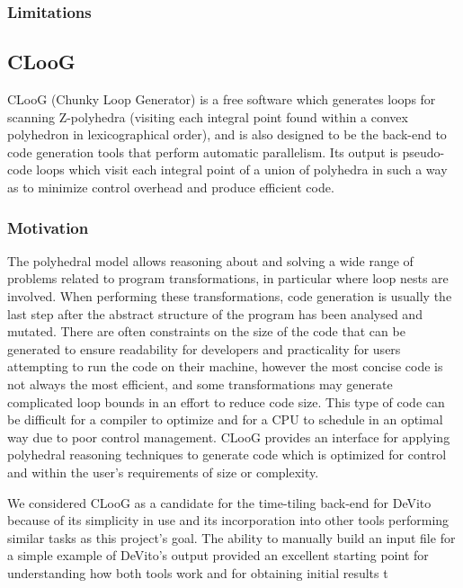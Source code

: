 \documentclass[a4paper,12pt,twoside]{report}
\begin{document}
\subsubsection{Limitations}

\subsection{CLooG}
CLooG (Chunky Loop Generator) is a free software which generates loops for scanning Z-polyhedra (visiting each integral
point found within a convex polyhedron in lexicographical order), and is also designed to be
the back-end to code generation tools that perform automatic parallelism. Its output is pseudo-code loops which visit
each integral point of a union of polyhedra in such a way as to minimize control overhead and produce efficient code.
\subsubsection{Motivation}
The polyhedral model allows reasoning about and solving a wide range of problems related to program transformations,
in particular where loop nests are involved. When performing these transformations, code generation is usually the last
step after the abstract structure of the program has been analysed and mutated. There are often constraints on the size of the code
that can be generated to ensure readability for developers and practicality for users attempting to run the code on their machine,
however the most concise code is not always the most efficient, and some transformations may generate complicated loop bounds in an effort
to reduce code size. This type of code can be difficult for a compiler to optimize and for a CPU to schedule in an optimal way due to
poor control management. CLooG provides an interface for applying polyhedral reasoning techniques to generate code which is optimized for control
and within the user's requirements of size or complexity.

We considered CLooG as a candidate for the time-tiling back-end for DeVito because of its simplicity in use and its incorporation into
other tools performing similar tasks as this project's goal. The ability to manually build an input file for a simple example of DeVito's
output provided an excellent starting point for understanding how both tools work and for obtaining initial results t
\end{document}
